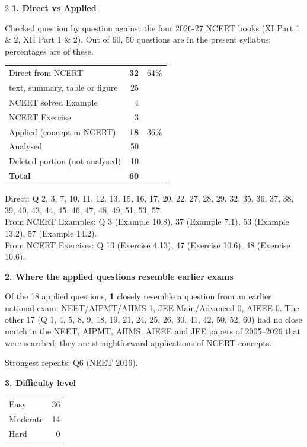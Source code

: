 \begin{multicols}{2}
\textbf{\color{crimson}1. Direct vs Applied}\par\smallskip
{\footnotesize Checked question by question against the four 2026-27 NCERT books (XI Part 1 \& 2, XII Part 1 \& 2). Out of 60, 50 questions are in the present syllabus; percentages are of these.}\par\smallskip
\begin{tabular}{@{}lrr@{}}\toprule
Direct from NCERT & \textbf{32} & 64\%\\
\quad text, summary, table or figure & 25 &\\
\quad NCERT solved Example & 4 &\\
\quad NCERT Exercise & 3 &\\
Applied (concept in NCERT) & \textbf{18} & 36\%\\\midrule
Analysed & 50 &\\
Deleted portion (not analysed) & 10 &\\\midrule
\textbf{Total} & \textbf{60} &\\\bottomrule\end{tabular}\par\smallskip
{\footnotesize Direct: Q 2, 3, 7, 10, 11, 12, 13, 15, 16, 17, 20, 22, 27, 28, 29, 32, 35, 36, 37, 38, 39, 40, 43, 44, 45, 46, 47, 48, 49, 51, 53, 57.\\ From NCERT Examples: Q 3 (Example 10.8), 37 (Example 7.1), 53 (Example 13.2), 57 (Example 14.2).\\ From NCERT Exercises: Q 13 (Exercise 4.13), 47 (Exercise 10.6), 48 (Exercise 10.6).}\par\medskip
\textbf{\color{crimson}2. Where the applied questions resemble earlier exams}\par\smallskip
Of the 18 applied questions, \textbf{1} closely resemble a question from an earlier national exam:
NEET/AIPMT/AIIMS 1, JEE Main/Advanced 0, AIEEE 0. The other 17 (Q 1, 4, 5, 8, 9, 18, 19, 21, 24, 25, 26, 30, 41, 42, 50, 52, 60) had no close match in the NEET, AIPMT, AIIMS, AIEEE and JEE papers of 2005--2026 that were searched; they are straightforward applications of NCERT concepts.\par
{\footnotesize Strongest repeats: Q6 (NEET 2016).}\par\medskip
\textbf{\color{crimson}3. Difficulty level}\par\smallskip
\begin{tabular}{@{}lr@{}}\toprule
Easy & 36\\ Moderate & 14\\ Hard & 0\\\bottomrule\end{tabular}\par\smallskip

\end{multicols}
